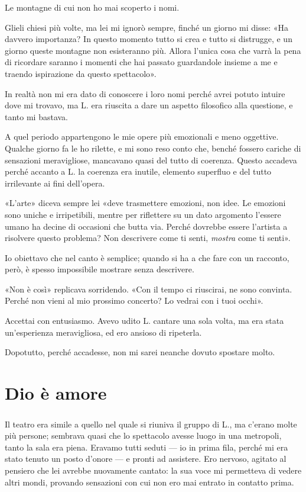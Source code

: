 \documentclass[a4paper,12pt]{book}
\begin{document}
Le montagne di cui non ho mai scoperto i nomi.

Glieli chiesi più volte, ma lei mi ignorò sempre, finché un giorno mi disse:
«Ha davvero importanza? In questo momento tutto si crea e tutto si distrugge,
e un giorno queste montagne non esisteranno più. Allora l'unica cosa che varrà
la pena di ricordare saranno i momenti che hai passato guardandole insieme a me
e traendo ispirazione da questo spettacolo».

In realtà non mi era dato di conoscere i loro nomi perché avrei potuto intuire
dove mi trovavo, ma L. era riuscita a dare un aspetto filosofico alla questione,
e tanto mi bastava.

A quel periodo appartengono le mie opere più emozionali e meno oggettive.
Qualche giorno fa le ho rilette, e mi sono reso conto che, benché fossero
cariche di sensazioni meravigliose, mancavano quasi del tutto di coerenza.
Questo accadeva perché accanto a L. la coerenza era inutile, elemento superfluo
e del tutto irrilevante ai fini dell'opera.

«L'arte» diceva sempre lei «deve trasmettere emozioni, non idee. Le emozioni
sono uniche e irripetibili, mentre per riflettere su un dato argomento l'essere
umano ha decine di occasioni che butta via. Perché dovrebbe essere l'artista a
risolvere questo problema? Non descrivere come ti senti, \emph{mostra} come ti
senti».

Io obiettavo che nel canto è semplice; quando si ha a che fare con un racconto,
però, è spesso impossibile mostrare senza descrivere.

«Non è così» replicava sorridendo. «Con il tempo ci riuscirai, ne sono convinta.
Perché non vieni al mio prossimo concerto? Lo vedrai con i tuoi occhi».

Accettai con entusiasmo. Avevo udito L. cantare una sola volta, ma era stata
un'esperienza meravigliosa, ed ero ansioso di ripeterla.

Dopotutto, perché accadesse, non mi sarei neanche dovuto spostare molto.

\chapter{Dio è amore}

\paragraph{}
Il teatro era simile a quello nel quale si riuniva il gruppo di L., ma c'erano
molte più persone; sembrava quasi che lo spettacolo avesse luogo in una
metropoli, tanto la sala era piena. Eravamo tutti seduti --- io in prima fila,
perché mi era stato tenuto un posto d'onore --- e pronti ad assistere. Ero
nervoso, agitato al pensiero che lei avrebbe nuovamente cantato: la sua voce mi
permetteva di vedere altri mondi, provando sensazioni con cui non ero mai
entrato in contatto prima.
\end{document}
